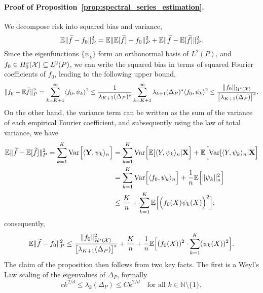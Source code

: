 \paragraph{Proof of Proposition~\ref{prop:spectral_series_estimation}.}
We decompose risk into squared bias and variance,
\begin{equation}
\label{pf:spectral_series_estimation_0}
\mathbb{E} \|\widetilde{f} - f_0\|_P^2 = \mathbb{E}\| \mathbb{E}[\widetilde{f}]  - f_0\|_P^2 + \mathbb{E}\| \widetilde{f} - \mathbb{E}[\widetilde{f}]\|_P^2.
\end{equation}
Since the eigenfunctions $\{\psi_k\}$ form an orthonormal basis of $L^2(P)$, and $f_0 \in H_0^{s}(\mathcal{X}) \subseteq L^2(P)$, we can write the squared bias in terms of squared Fourier coefficients of $f_0$, leading to the following upper bound,
\begin{equation*}
\|f_0 - \mathbb{E}{\widetilde{f}}\|_P^2 = \sum_{k = K + 1}^{\infty}  \langle f_0, \psi_k \rangle^2 \leq  \frac{1}{\lambda_{K + 1}(\Delta_P)^s} \sum_{k = K + 1}^{\infty} \lambda_{k + 1}(\Delta_P)^s \langle f_0, \psi_k \rangle^2 \leq \frac{\|f_0\|_{\mathcal{H}^s(\mathcal{X})}}{\bigl[\lambda_{K + 1}(\Delta_P)\bigr]^s}.
\end{equation*}
On the other hand, the variance term can be written as the sum of the variance of each empirical Fourier coefficient, and subsequently using the law of total variance, we have
\begin{align}
\label{pf:spectral_series_estimation_2}
\mathbb{E}\| \widetilde{f} - \mathbb{E}[\widetilde{f}]\|_P^2 = \sum_{k = 1}^{K} \mathrm{Var}\Bigl[\langle {\bf Y}, \psi_k \rangle_n\Bigr] & = \sum_{k = 1}^{K} \mathrm{Var}\Bigl[\mathbb{E}[\langle Y, \psi_k \rangle_n|{\bf X}\Bigr] + \mathbb{E}\Bigl[\mathrm{Var}[\langle Y, \psi_k \rangle_n|{\bf X}\Bigr] \nonumber \\
& = \sum_{k = 1}^{K} \mathrm{Var}\Bigl[\langle f_0, \psi_k \rangle_n\Bigr] + \frac{1}{n}\mathbb{E}\Bigl[\|\psi_k\|_n^2\Bigr] \nonumber \\
& \leq \frac{K}{n} + \sum_{k = 1}^{K}\mathbb{E}\Bigl[\Bigl(f_0(X)\psi_k(X)\Bigr)^2\Bigr];
\end{align}
consequently,
\begin{equation}
\label{pf:spectral_series_estimation_1}
\mathbb{E} \|\widetilde{f} - f_0\|_P^2 \leq \frac{\|f_0\|_{\mathcal{H}^s(\mathcal{X})}^2}{\bigl[\lambda_{K + 1}(\Delta_P)\bigr]^s} + \frac{K}{n} + \frac{1}{n}\mathbb{E}\Bigl[(f_0(X))^2 \cdot \sum_{k = 1}^{K} (\psi_k(X))^2\Bigr].
\end{equation}
The claim of the proposition then follows from two key facts. The first is a Weyl's Law scaling of the eigenvalues of $\Delta_P$, formally
\begin{equation}
\label{eqn:weyl}
ck^{2/d} \leq \lambda_k(\Delta_P) \leq Ck^{2/d}\quad\textrm{for all $k \in \mathbb{N}\setminus \{1\}$},
\end{equation}
